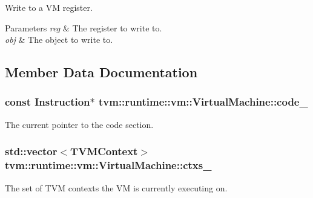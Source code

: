 Write to a VM register. 


\begin{DoxyParams}{Parameters}
{\em reg} & The register to write to. \\
\hline
{\em obj} & The object to write to. \\
\hline
\end{DoxyParams}


\subsection{Member Data Documentation}
\subsubsection[{\texorpdfstring{code\+\_\+}{code_}}]{\setlength{\rightskip}{0pt plus 5cm}const {\bf Instruction}$\ast$ tvm\+::runtime\+::vm\+::\+Virtual\+Machine\+::code\+\_\+\hspace{0.3cm}{\ttfamily [protected]}}\hypertarget{classtvm_1_1runtime_1_1vm_1_1VirtualMachine_ab220bfa34c9abb2935c3b622d9bc03b2}{}\label{classtvm_1_1runtime_1_1vm_1_1VirtualMachine_ab220bfa34c9abb2935c3b622d9bc03b2}


The current pointer to the code section. 

\subsubsection[{\texorpdfstring{ctxs\+\_\+}{ctxs_}}]{\setlength{\rightskip}{0pt plus 5cm}std\+::vector$<${\bf T\+V\+M\+Context}$>$ tvm\+::runtime\+::vm\+::\+Virtual\+Machine\+::ctxs\+\_\+\hspace{0.3cm}{\ttfamily [protected]}}\hypertarget{classtvm_1_1runtime_1_1vm_1_1VirtualMachine_ae52ecf76ef854f8288ca2baa8f9d01ed}{}\label{classtvm_1_1runtime_1_1vm_1_1VirtualMachine_ae52ecf76ef854f8288ca2baa8f9d01ed}


The set of T\+VM contexts the VM is currently executing on. 

